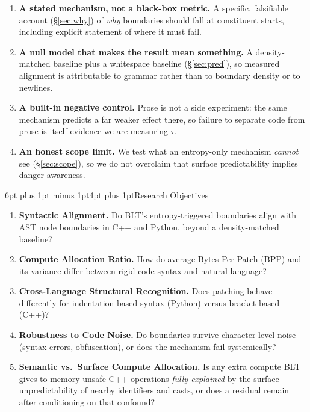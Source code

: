 \documentclass[9pt]{extarticle}
\makeatletter
\renewcommand\section{\@startsection{section}{1}{0pt}%
  {6pt plus 1pt minus 1pt}{4pt plus 1pt}{\normalfont\large\bfseries}}
\makeatother
\begin{document}
\begin{enumerate}
\item \textbf{A stated mechanism, not a black-box metric.} A specific, falsifiable
account (\S\ref{sec:why}) of \emph{why} boundaries should fall at constituent
starts, including explicit statement of where it must fail.
\item \textbf{A null model that makes the result mean something.} A
density-matched baseline plus a whitespace baseline (\S\ref{sec:pred}), so
measured alignment is attributable to grammar rather than to boundary density or
to newlines.
\item \textbf{A built-in negative control.} Prose is not a side experiment: the
same mechanism predicts a far weaker effect there, so failure to separate code
from prose is itself evidence we are measuring $\tau$.
\item \textbf{An honest scope limit.} We test what an entropy-only mechanism
\emph{cannot} see (\S\ref{sec:scope}), so we do not overclaim that surface
predictability implies danger-awareness.
\end{enumerate}

\section{Research Objectives}

\begin{enumerate}[label=\textbf{O\arabic*.}]
\item \textbf{Syntactic Alignment.} Do BLT's entropy-triggered boundaries align
with AST node boundaries in C++ and Python, beyond a density-matched baseline?
\item \textbf{Compute Allocation Ratio.} How do average Bytes-Per-Patch (BPP) and
its variance differ between rigid code syntax and natural language?
\item \textbf{Cross-Language Structural Recognition.} Does patching behave
differently for indentation-based syntax (Python) versus bracket-based (C++)?
\item \textbf{Robustness to Code Noise.} Do boundaries survive character-level
noise (syntax errors, obfuscation), or does the mechanism fail systemically?
\item \textbf{Semantic vs.\ Surface Compute Allocation.} Is any extra compute BLT
gives to memory-unsafe C++ operations \emph{fully explained} by the surface
unpredictability of nearby identifiers and casts, or does a residual remain after
conditioning on that confound?
\end{enumerate}
\end{document}
